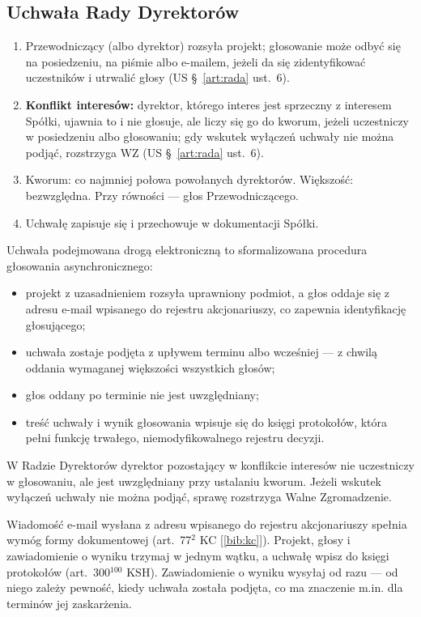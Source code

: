 \documentclass[11pt,a4paper]{report}
\newcommand{\Zr}[1]{[\ref{bib:#1}]}
\begin{document}
\subsection*{Uchwała Rady Dyrektorów}

\begin{enumerate}
  \item Przewodniczący (albo dyrektor) rozsyła projekt; głosowanie może odbyć się na posiedzeniu, na piśmie albo e-mailem, jeżeli da się zidentyfikować uczestników i utrwalić głosy (US §~\ref{art:rada} ust.~6).
  \item \textbf{Konflikt interesów:} dyrektor, którego interes jest sprzeczny z interesem Spółki, ujawnia to i nie głosuje, ale liczy się go do kworum, jeżeli uczestniczy w posiedzeniu albo głosowaniu; gdy wskutek wyłączeń uchwały nie można podjąć, rozstrzyga WZ (US §~\ref{art:rada} ust.~6).
  \item Kworum: co najmniej połowa powołanych dyrektorów. Większość: bezwzględna. Przy równości --- głos Przewodniczącego.
  \item Uchwałę zapisuje się i przechowuje w dokumentacji Spółki.
\end{enumerate}

\begin{OCoChodzi}
Uchwała podejmowana drogą elektroniczną to sformalizowana procedura głosowania asynchronicznego:
\begin{itemize}
  \item projekt z uzasadnieniem rozsyła uprawniony podmiot, a głos oddaje się z adresu e-mail wpisanego do rejestru akcjonariuszy, co zapewnia identyfikację głosującego;
  \item uchwała zostaje podjęta z upływem terminu albo wcześniej --- z chwilą oddania wymaganej większości wszystkich głosów;
  \item głos oddany po terminie nie jest uwzględniany;
  \item treść uchwały i wynik głosowania wpisuje się do księgi protokołów, która pełni funkcję trwałego, niemodyfikowalnego rejestru decyzji.
\end{itemize}
W Radzie Dyrektorów dyrektor pozostający w konflikcie interesów nie uczestniczy w głosowaniu, ale jest uwzględniany przy ustalaniu kworum. Jeżeli wskutek wyłączeń uchwały nie można podjąć, sprawę rozstrzyga Walne Zgromadzenie.
\end{OCoChodzi}

\begin{Komentarz}
Wiadomość e-mail wysłana z adresu wpisanego do rejestru akcjonariuszy spełnia wymóg formy dokumentowej (art.~77$^{2}$ KC \Zr{kc}). Projekt, głosy i zawiadomienie o wyniku trzymaj w jednym wątku, a uchwałę wpisz do księgi protokołów (art.~300$^{100}$ KSH). Zawiadomienie o wyniku wysyłaj od razu --- od niego zależy pewność, kiedy uchwała została podjęta, co ma znaczenie m.in. dla terminów jej zaskarżenia.
\end{Komentarz}
\end{document}
